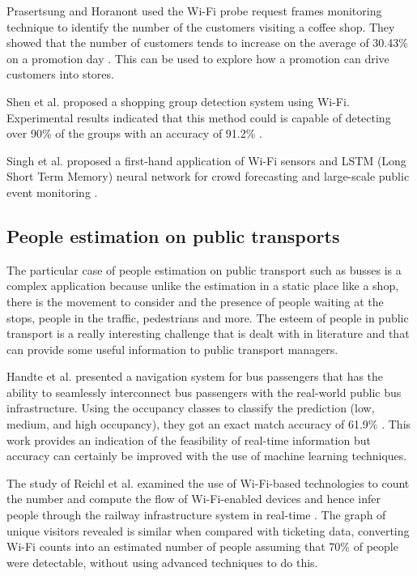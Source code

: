 Prasertsung and Horanont used the Wi-Fi probe request frames monitoring technique to identify the number of the customers visiting a coffee shop. They showed that the number of customers tends to increase on the average of 30.43\% on a promotion day \cite{prasertsung2017does}. This can be used to explore how a promotion can drive customers into stores.

Shen et al. proposed a shopping group detection system using Wi-Fi. Experimental results indicated that this method could is capable of detecting over 90\% of the groups with an accuracy of 91.2\% \cite{shen2018snow}.

Singh et al. proposed a first-hand application of Wi-Fi sensors and LSTM (Long Short Term Memory) neural network for crowd forecasting and large-scale public event monitoring \cite{singh2020crowd}.


\vspace{0.1 cm}
\subsection{People estimation on public transports}
\label{sec:transports}
\vspace{0.1 cm}

The particular case of people estimation on public transport such as busses is a complex application because unlike the estimation in a static place like a shop, there is the movement to consider and the presence of people waiting at the stops, people in the traffic, pedestrians and more. The esteem of people in public transport is a really interesting challenge that is dealt with in literature and that can provide some useful information to public transport managers.

Handte et al.  presented a navigation system for bus passengers that has the ability to seamlessly interconnect bus passengers with the real-world public bus infrastructure. Using the occupancy classes to classify the prediction (low, medium, and high occupancy), they got an exact match accuracy of 61.9\% \cite{handte2016internet}. This work provides an indication of the feasibility of real-time information but accuracy can certainly be improved with the use of machine learning techniques.

The study of Reichl et al. examined the use of Wi-Fi-based technologies to count the number and compute the flow of Wi-Fi-enabled devices and hence infer people through the railway infrastructure system in real-time \cite{reichl2018using}. The graph of unique visitors revealed is similar when compared with ticketing data, converting Wi-Fi counts into an estimated number of people assuming that 70\% of people were detectable, without using advanced techniques to do this.

